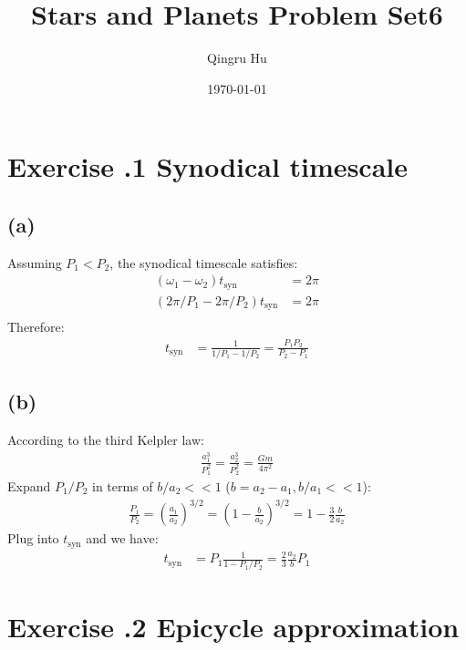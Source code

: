 \documentclass[a4paper,12pt]{article}
\title{\textbf{Stars and Planets Problem Set6}}
\author{Qingru Hu}
\date{\today}
\begin{document}
\maketitle
\section*{\textbf{Exercise \uppercase\expandafter{}.1 Synodical timescale}}
\subsection*{(a)}
Assuming $P_1<P_2$, the synodical timescale satisfies:
\begin{align*}
    (\omega_1 - \omega_2) t_{\text{syn}} &= 2\pi \\
    (2\pi/P_1 - 2\pi/P_2) t_{\text{syn}} &= 2\pi \\
\end{align*}
Therefore:
\begin{align*}
    t_{\text{syn}} &= \frac{1}{1/P_1 - 1/P_2} = \frac{P_1 P_2}{P_2 - P_1}
\end{align*}

\subsection*{(b)}
According to the third Kelpler law:
\begin{align*}
    \frac{a_1^3}{P_1^2} = \frac{a_2^3}{P_2^2} = \frac{Gm}{4\pi^2}
\end{align*}
Expand $P_1/P_2$ in terms of $b/a_2<<1$ ($b = a_2 - a_1, b/a_1<<1$):
\begin{align*}
    \frac{P_1}{P_2} = (\frac{a_1}{a_2})^{3/2} = (1 - \frac{b}{a_2})^{3/2} = 1 - \frac{3}{2} \frac{b}{a_2}
\end{align*}
Plug into $t_{\text{syn}}$ and we have:
\begin{align*}
    t_{\text{syn}} &= P_1\frac{1}{1 - P_1/P_2} =\frac{2}{3} \frac{a_2}{b} P_1
\end{align*}


\section*{\textbf{Exercise \uppercase\expandafter{}.2 Epicycle approximation}}
\end{document}
